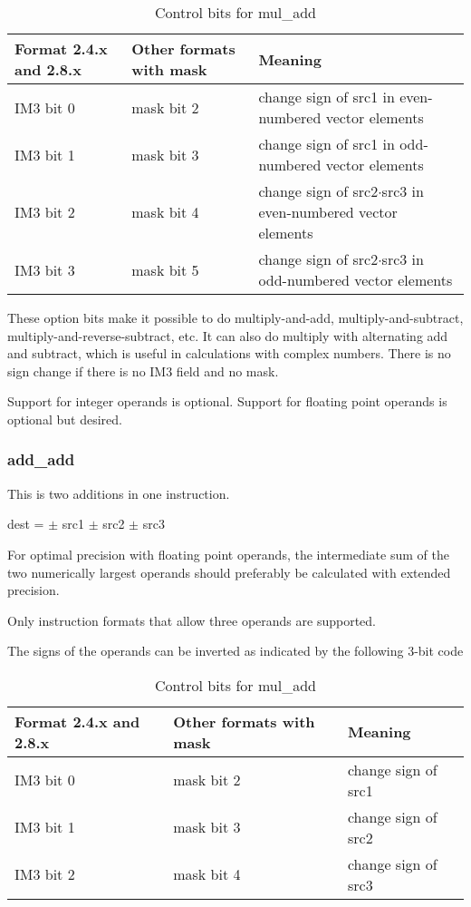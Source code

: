 \documentclass[forwardcom.tex]{subfiles}
\begin{document}
\begin{longtable} {|p{20mm}|p{20mm}|p{75mm}|}
\caption{Control bits for mul\_add} 
\label{table:ControlBitsForMulAdd} \\
\endfirsthead
\endhead
\hline
\bfseries Format 2.4.x and 2.8.x & \bfseries Other formats with mask & \bfseries Meaning   \\
\hline
IM3 bit 0 & mask bit 2 & change sign of src1 in even-numbered vector elements \\
IM3 bit 1 & mask bit 3 & change sign of src1 in odd-numbered vector elements \\
IM3 bit 2 & mask bit 4 & change sign of src2$\cdot$src3 in even-numbered vector elements \\
IM3 bit 3 & mask bit 5 & change sign of src2$\cdot$src3 in odd-numbered vector elements \\
\hline
\end{longtable}

\vspace{2mm}
These option bits make it possible to do multiply-and-add, multiply-and-subtract, multiply-and-reverse-subtract, etc. It can also do multiply with alternating add and subtract, which is useful in calculations with complex numbers. 
There is no sign change if there is no IM3 field and no mask. 

\vspace{2mm}
Support for integer operands is optional. Support for floating point operands is optional but desired.

\subsubsection{add\_add}  \label{addAdd}
This is two additions in one instruction.
\vspace{2mm}

dest = $\pm$ src1 $\pm$ src2 $\pm$ src3
\vspace{2mm}

For optimal precision with floating point operands, the intermediate sum of the two numerically largest operands should preferably be calculated with extended precision.
\vspace{2mm}

Only instruction formats that allow three operands are supported.
\vspace{2mm}

The signs of the operands can be inverted as indicated by the following 3-bit code

\begin{longtable} {|p{20mm}|p{20mm}|p{75mm}|}
\caption{Control bits for mul\_add} 
\label{table:ControlBitsForMulAdd} \\
\endfirsthead
\endhead
\hline
\bfseries Format 2.4.x and 2.8.x & \bfseries Other formats with mask & \bfseries Meaning   \\
\hline
IM3 bit 0 & mask bit 2 & change sign of src1 \\
IM3 bit 1 & mask bit 3 & change sign of src2 \\
IM3 bit 2 & mask bit 4 & change sign of src3 \\
\hline
\end{longtable}
\end{document}
